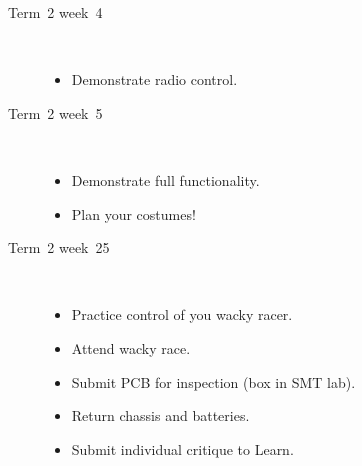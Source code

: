 \begin{description}
\item [Term~2 week~4]\mbox{}\\  
  
  \begin{itemize}
  \item Demonstrate radio control.
  \end{itemize}  
  
\item [Term~2 week~5]\mbox{}\\
  
  \begin{itemize}
  \item Demonstrate full functionality.
  \item Plan your costumes!
  \end{itemize}
  
\item [Term~2 week~25]\mbox{}\\
  
  \begin{itemize}
  \item Practice control of you wacky racer.
  \item Attend wacky race.
  \item Submit PCB for inspection (box in SMT lab).
  \item Return chassis and batteries.
  \item Submit individual critique to Learn.    
  \end{itemize}
  
\end{description}
